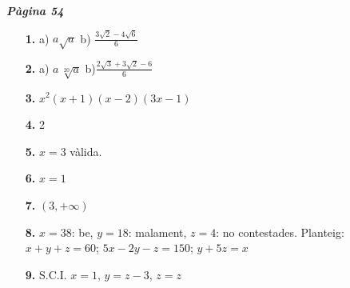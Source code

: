 \documentclass[a4paper, pdf, twoside]{book}
\begin{document}
\begin{multicols}{2}
{\textbf{\em Pàgina 54}} \hrulefill
\begin{enumerate}
\vspace{0.25cm}
\item[\fontfamily{phv}\selectfont\color{blue}\textbf{1. }]  \scalebox{0.6}{\simbolclau } 
a) $a\sqrt {a}$ \quad \quad b) $\frac {3\sqrt {2}-4\sqrt {6}}{6}$
 \end{enumerate}
\begin{enumerate}
\vspace{0.25cm}
\item[\fontfamily{phv}\selectfont\color{blue}\textbf{2. }]  \scalebox{0.6}{\simbolclau } 
a) $a\,\sqrt [20]{a}$ \quad \quad b)$\frac {2\sqrt {3}+3\sqrt {2}-6}{6}$
\vspace{0.25cm}
\item[\fontfamily{phv}\selectfont\color{blue}\textbf{3. }]  \scalebox{0.6}{\simbolclau } 
$x^2 (x+1) (x-2) (3x-1)$
\vspace{0.25cm}
\item[\fontfamily{phv}\selectfont\color{blue}\textbf{4. }]  \scalebox{0.6}{\simbolclau } 
2
\vspace{0.25cm}
\item[\fontfamily{phv}\selectfont\color{blue}\textbf{5. }]  \scalebox{0.6}{\simbolclau } 
$x=3$ vàlida.
\vspace{0.25cm}
\item[\fontfamily{phv}\selectfont\color{blue}\textbf{6. }]  \scalebox{0.6}{\simbolclau } 
$x=1$
\vspace{0.25cm}
\item[\fontfamily{phv}\selectfont\color{blue}\textbf{7. }]  \scalebox{0.6}{\simbolclau } 
$(3, +\infty )$
\vspace{0.25cm}
\item[\fontfamily{phv}\selectfont\color{blue}\textbf{8. }]  \scalebox{0.6}{\simbolclau } 
$x=38$: be, $y=18$: malament, $z=4$: no contestades. Planteig: $x+y+z=60$; $5x-2y-z=150$; $y+5z=x$
\vspace{0.25cm}
\item[\fontfamily{phv}\selectfont\color{blue}\textbf{9. }]  \scalebox{0.6}{\simbolclau } 
S.C.I. $x=1$, $y=z-3$, $z=z$
 \end{enumerate}
\vspace{0.3cm}



\end{multicols}
\end{document}
